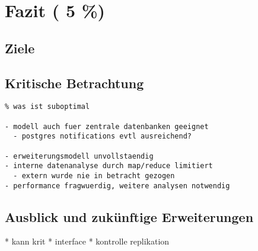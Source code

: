 \chapter{Fazit ( 5 \%)}
\section{Ziele}


\section{Kritische Betrachtung}
\begin{verbatim}
% was ist suboptimal

- modell auch fuer zentrale datenbanken geeignet
  - postgres notifications evtl ausreichend?

- erweiterungsmodell unvollstaendig
- interne datenanalyse durch map/reduce limitiert
  - extern wurde nie in betracht gezogen
- performance fragwuerdig, weitere analysen notwendig
\end{verbatim}




\section{Ausblick und zukünftige Erweiterungen}

* kann krit
* interface
* kontrolle replikation

